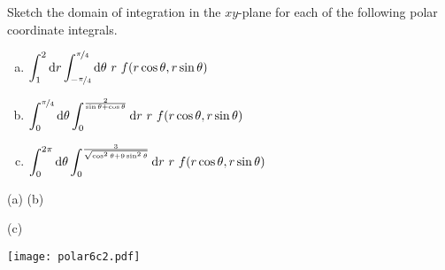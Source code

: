 \begin{question}
Sketch the domain of integration in the $xy$-plane for each of the 
following polar coordinate integrals.
\begin{enumerate}[(a)]
\item
$\displaystyle 
      \int_1^2\mathrm{d}r
     \int_{-\nicefrac{\pi}{4}}^{\nicefrac{\pi}{4}}\mathrm{d}\theta
     \ r\ f(r\cos\theta,r\sin\theta)$

\item
$\displaystyle 
     \int_0^{\nicefrac{\pi}{4}}\mathrm{d}\theta
     \int_0^{\frac{2}{\sin\theta+\cos\theta}}\mathrm{d}r
     \ r\ f(r\cos\theta,r\sin\theta)$
\item
$\displaystyle 
     \int_0^{2\pi}\mathrm{d}\theta
     \int_0^{\frac{3}{\sqrt{\cos^2\theta+9\sin^2\theta}}}\mathrm{d}r
     \ r\ f(r\cos\theta,r\sin\theta)$
\end{enumerate}
\end{question}


\begin{answer}
\begin{center}
    (a)\quad 
     \hfill
    (b)\quad {}
\end{center}

(c)
\begin{center}
     \texttt{[image: polar6c2.pdf]}
\end{center}

\end{answer}

